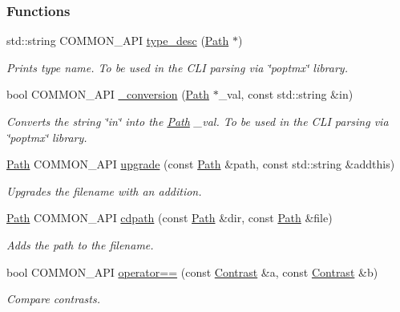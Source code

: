\subsubsection*{Functions}
\begin{DoxyCompactItemize}
\item 
std::string COMMON\_\-API \hyperlink{group__Types_ga8fd2857cd3b4a7006c31dd06af0f3e78}{type\_\-desc} (\hyperlink{classPath}{Path} $\ast$)
\begin{DoxyCompactList}\small\item\em Prints type name. To be used in the CLI parsing via \char`\"{}poptmx\char`\"{} library. \item\end{DoxyCompactList}\item 
bool COMMON\_\-API \hyperlink{group__Types_ga4e0eee1b7fdba3969d084be434981931}{\_\-conversion} (\hyperlink{classPath}{Path} $\ast$\_\-val, const std::string \&in)
\begin{DoxyCompactList}\small\item\em Converts the string \char`\"{}in\char`\"{} into the \hyperlink{classPath}{Path} \_\-val. To be used in the CLI parsing via \char`\"{}poptmx\char`\"{} library. \item\end{DoxyCompactList}\item 
\hyperlink{classPath}{Path} COMMON\_\-API \hyperlink{group__Types_gad3c78ff20aae27d0ada01a8ec7c33512}{upgrade} (const \hyperlink{classPath}{Path} \&path, const std::string \&addthis)
\begin{DoxyCompactList}\small\item\em Upgrades the filename with an addition. \item\end{DoxyCompactList}\item 
\hyperlink{classPath}{Path} COMMON\_\-API \hyperlink{group__Types_ga4de1e55e650dc8f387cbccfcf26fe51f}{cdpath} (const \hyperlink{classPath}{Path} \&dir, const \hyperlink{classPath}{Path} \&file)
\begin{DoxyCompactList}\small\item\em Adds the path to the filename. \item\end{DoxyCompactList}\item 
bool COMMON\_\-API \hyperlink{group__Types_ga9e64a10e0cc4fff11763fa59660ec038}{operator==} (const \hyperlink{classContrast}{Contrast} \&a, const \hyperlink{classContrast}{Contrast} \&b)
\begin{DoxyCompactList}\small\item\em Compare contrasts. \item\end{DoxyCompactList}\item 

\end{DoxyCompactItemize}
